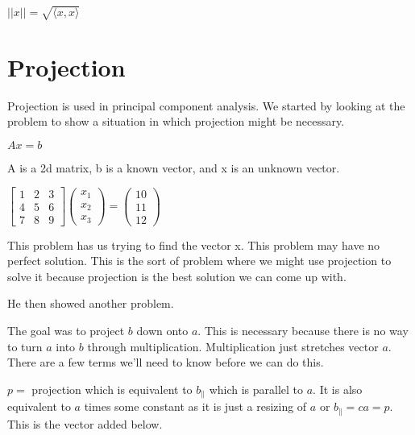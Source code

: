 \vspace{0.8em} 

$||x|| = \sqrt{\langle x,x \rangle}$


\section{Projection}

Projection is used in principal component analysis. We started by looking at the problem to show a situation in which projection might be necessary.

$Ax=b$

A is a 2d matrix, b is a known vector, and x is an unknown vector.

$\begin{bmatrix}
1 & 2 & 3\\
4 & 5 & 6\\
7 & 8 & 9
\end{bmatrix}
\begin{pmatrix}
x_1\\
x_2\\
x_3
\end{pmatrix}
=
\begin{pmatrix}
10\\
11\\
12
\end{pmatrix}$

This problem has us trying to find the vector x. 
This problem may have no perfect solution. 
This is the sort of problem where we might use projection to solve it because projection is the best solution we can come up with.

He then showed another problem.


The goal was to project $b$ down onto $a$. This is necessary because there is no way to turn $a$ into $b$ through multiplication. Multiplication just stretches vector $a$. There are a few terms we'll need to know before we can do this.

$p =$ projection which is equivalent to $b_\|$ which is parallel to $a$. It is also equivalent to $a$ times some constant as it is just a resizing of $a$ or $b_\| = ca = p$. This is the vector added below.

